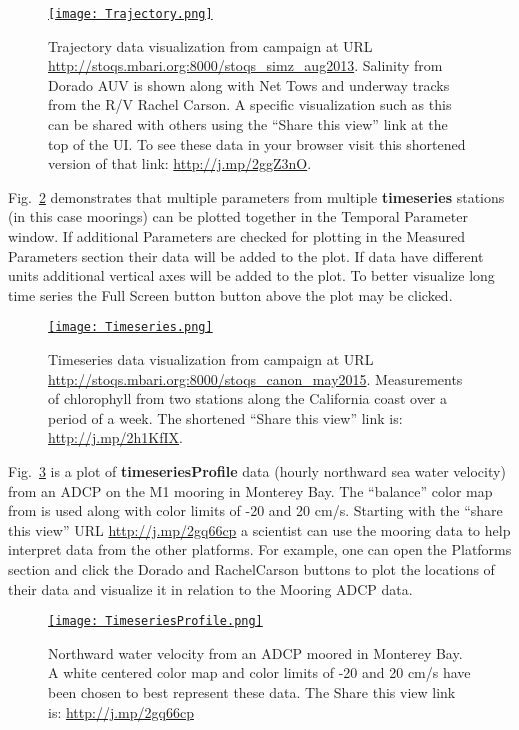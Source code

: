 \documentclass[conference]{IEEEtran}
\begin{document}
\begin{figure}[htbp]
\centering
\href{http://j.mp/2ggZ3nO}{\texttt{[image: Trajectory.png]}}
\caption{Trajectory data visualization from campaign at URL \url{http://stoqs.mbari.org:8000/stoqs_simz_aug2013}.
Salinity from Dorado AUV is shown along with Net Tows and underway tracks from the R/V Rachel Carson.
A specific visualization such as this can be shared with others using the ``Share this view'' link at the
top of the UI. To see these data in your browser visit this shortened version of that link: \url{http://j.mp/2ggZ3nO}.}
\label{fig:Trajectory}
\end{figure}

Fig.~\ref{fig:Timeseries} demonstrates that multiple parameters from multiple \textbf{timeseries} stations
(in this case moorings) can be plotted together in the Temporal Parameter window. If additional Parameters
are checked for plotting in the Measured Parameters section their data will be added to the plot.
If data have different units additional vertical axes will be added to the plot.
To better visualize long time series the Full Screen button button above the plot may be clicked.

\begin{figure}[htbp]
\centering
\href{http://j.mp/2h1KfIX}{\texttt{[image: Timeseries.png]}}
\caption{Timeseries data visualization from campaign at URL \url{http://stoqs.mbari.org:8000/stoqs_canon_may2015}.
Measurements of chlorophyll from two stations along the California coast over a period of a week.
The shortened ``Share this view'' link is: \url{http://j.mp/2h1KfIX}.}
\label{fig:Timeseries}
\end{figure}

Fig.~\ref{fig:TimeseriesProfile} is a plot of \textbf{timeseriesProfile} data (hourly northward sea water velocity)
from an ADCP on the M1 mooring in Monterey Bay. The ``balance'' color map from \cite{cmocean} is used along with 
color limits of -20 and 20 cm/s. Starting with the ``share this view'' URL \url{http://j.mp/2gq66cp} a scientist
can use the mooring data to help interpret data from the other platforms. For example, one can open the
Platforms section and click the Dorado and RachelCarson buttons to plot the locations of their data and
visualize it in relation to the Mooring ADCP data.

\begin{figure}[htbp]
\centering
\href{http://j.mp/2gq66cp}{\texttt{[image: TimeseriesProfile.png]}}
\caption{Northward water velocity from an ADCP moored in Monterey Bay. A white centered color map and color
limits of -20 and 20 cm/s have been chosen to best represent these data. The Share this view link is: \url{http://j.mp/2gq66cp}}
\label{fig:TimeseriesProfile}
\end{figure}
\end{document}
